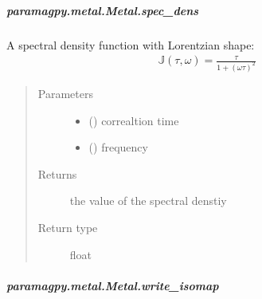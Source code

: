 \documentclass[a4paper,10pt,english,openany,oneside]{sphinxmanual}
\begin{document}
\begin{fulllineitems}
\begin{fulllineitems}
\begin{fulllineitems}
\end{fulllineitems}



\subparagraph{paramagpy.metal.Metal.spec\_dens}
\label{\detokenize{reference/generated/paramagpy.metal.Metal.spec_dens:paramagpy-metal-metal-spec-dens}}\label{\detokenize{reference/generated/paramagpy.metal.Metal.spec_dens::doc}}

\begin{fulllineitems}
\label{\detokenize{reference/generated/paramagpy.metal.Metal.spec_dens:paramagpy.metal.Metal.spec_dens}}
A spectral density function with Lorentzian shape:
\begin{equation*}
\begin{split}\mathbb{J}(\tau,\omega)=\frac{\tau}{1+(\omega\tau)^2}\end{split}
\end{equation*}\begin{quote}\begin{description}
\item[{Parameters}] \leavevmode\begin{itemize}
\item {} 
 () \textendash{} correaltion time

\item {} 
 () \textendash{} frequency

\end{itemize}

\item[{Returns}] \leavevmode
{} \textendash{} the value of the spectral denstiy

\item[{Return type}] \leavevmode
float

\end{description}\end{quote}

\end{fulllineitems}



\subparagraph{paramagpy.metal.Metal.write\_isomap}
\label{\detokenize{reference/generated/paramagpy.metal.Metal.write_isomap:paramagpy-metal-metal-write-isomap}}\label{\detokenize{reference/generated/paramagpy.metal.Metal.write_isomap::doc}}


\end{fulllineitems}
\end{fulllineitems}
\end{document}

